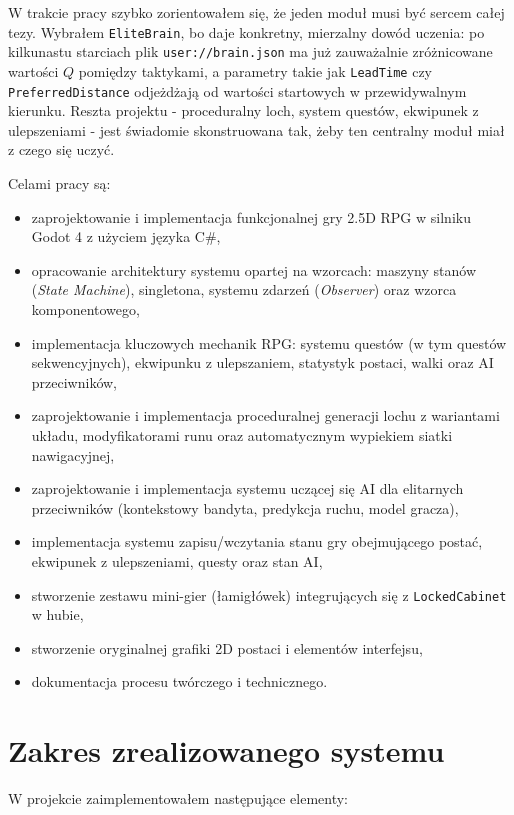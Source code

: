 W trakcie pracy szybko zorientowałem się, że jeden moduł musi być sercem całej tezy. Wybrałem \texttt{EliteBrain}, bo daje konkretny, mierzalny dowód uczenia: po kilkunastu starciach plik \texttt{user://brain.json} ma już zauważalnie zróżnicowane wartości $Q$ pomiędzy taktykami, a parametry takie jak \texttt{LeadTime} czy \texttt{PreferredDistance} odjeżdżają od wartości startowych w przewidywalnym kierunku. Reszta projektu - proceduralny loch, system questów, ekwipunek z ulepszeniami - jest świadomie skonstruowana tak, żeby ten centralny moduł miał z czego się uczyć.

Celami pracy są:
\begin{itemize}
    \item zaprojektowanie i implementacja funkcjonalnej gry 2.5D RPG w silniku Godot 4 z użyciem języka C\#,
    \item opracowanie architektury systemu opartej na wzorcach: maszyny stanów (\textit{State Machine}), singletona, systemu zdarzeń (\textit{Observer}) oraz wzorca komponentowego,
    \item implementacja kluczowych mechanik RPG: systemu questów (w tym questów sekwencyjnych), ekwipunku z ulepszaniem, statystyk postaci, walki oraz AI przeciwników,
    \item zaprojektowanie i implementacja proceduralnej generacji lochu z wariantami układu, modyfikatorami runu oraz automatycznym wypiekiem siatki nawigacyjnej,
    \item zaprojektowanie i implementacja systemu uczącej się AI dla elitarnych przeciwników (kontekstowy bandyta, predykcja ruchu, model gracza),
    \item implementacja systemu zapisu/wczytania stanu gry obejmującego postać, ekwipunek z ulepszeniami, questy oraz stan AI,
    \item stworzenie zestawu mini-gier (łamigłówek) integrujących się z \texttt{LockedCabinet} w hubie,
    \item stworzenie oryginalnej grafiki 2D postaci i elementów interfejsu,
    \item dokumentacja procesu twórczego i technicznego.
\end{itemize}

\section{Zakres zrealizowanego systemu}

W projekcie zaimplementowałem następujące elementy:

